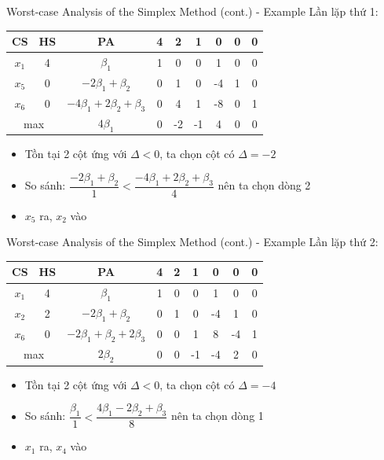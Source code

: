 \documentclass[10pt]{beamer}
\begin{document}
\begin{frame}{Worst-case Analysis of the Simplex Method (cont.) - Example}
Lần lặp thứ 1:
\begin{table}[H]
\centering
\begin{tabular}{|c|c|c|c|c|c|c|c|c|}
\hline
CS & HS & PA & 4 & 2 & 1 & 0 & 0 & 0 \\
\hline
$x_1$ & 4 & $\beta_1$ & 1 & 0 & 0 & 1 & 0 & 0 \\
$x_5$ & 0 & $-2\beta_1 + \beta_2$ & 0 & 1 & 0 & -4 & 1 & 0 \\
$x_6$ & 0 & $-4\beta_1 + 2\beta_2 + \beta_3$ & 0 & 4 & 1 & -8 & 0 & 1 \\
\hline
\multicolumn{2}{|c|}{max}
& $4\beta_1$ & 0 & -2 & -1 & 4 & 0 & 0 \\
\hline
\end{tabular}
\end{table}
\begin{itemize}
\item Tồn tại 2 cột ứng với $\Delta < 0$, ta chọn cột có $\Delta = -2$
\item So sánh: $\dfrac{-2\beta_1 + \beta_2}{1} < \dfrac{-4\beta_1 + 2\beta_2 + \beta_3}{4}$ nên ta chọn dòng 2
\item $x_5$ ra, $x_2$ vào
\end{itemize}
\end{frame}

\begin{frame}{Worst-case Analysis of the Simplex Method (cont.) - Example}
Lần lặp thứ 2:
\begin{table}[H]
\centering
\begin{tabular}{|c|c|c|c|c|c|c|c|c|}
\hline
CS & HS & PA & 4 & 2 & 1 & 0 & 0 & 0 \\
\hline
$x_1$ & 4 & $\beta_1$ & 1 & 0 & 0 & 1 & 0 & 0 \\
$x_2$ & 2 & $-2\beta_1 + \beta_2$ & 0 & 1 & 0 & -4 & 1 & 0 \\
$x_6$ & 0 & $-2\beta_1 + \beta_2 + 2\beta_3$ & 0 & 0 & 1 & 8 & -4 & 1 \\
\hline
\multicolumn{2}{|c|}{max}
& $2\beta_2$ & 0 & 0 & -1 & -4 & 2 & 0 \\
\hline
\end{tabular}
\end{table}
\begin{itemize}
\item Tồn tại 2 cột ứng với $\Delta < 0$, ta chọn cột có $\Delta = -4$
\item So sánh: $\dfrac{\beta_1}{1} < \dfrac{4\beta_1 - 2\beta_2 + \beta_3}{8}$ nên ta chọn dòng 1
\item $x_1$ ra, $x_4$ vào
\end{itemize}
\end{frame}
\end{document}
